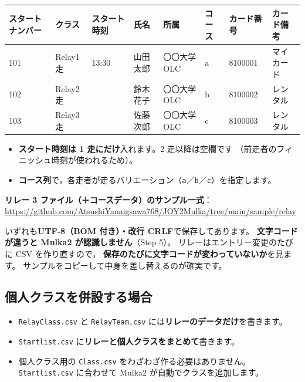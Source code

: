 \begin{center}
\small
\begin{tabular}{@{}llllllll@{}}
\toprule
スタートナンバー & クラス & スタート時刻 & 氏名 & 所属 & コース & カード番号 & カード備考 \\
\midrule
101 & Relay1走 & 13:30 & 山田 太郎 & 〇〇大学OLC & a & 8100001 & マイカード \\
102 & Relay2走 & & 鈴木 花子 & 〇〇大学OLC & b & 8100002 & レンタル \\
103 & Relay3走 & & 佐藤 次郎 & 〇〇大学OLC & c & 8100003 & レンタル \\
\bottomrule
\end{tabular}
\end{center}

\begin{itemize}
\item \textbf{スタート時刻は 1 走にだけ}入れます。2 走以降は空欄です
      （前走者のフィニッシュ時刻が使われるため）。
\item \textbf{コース列}で，各走者が走るバリエーション（\texttt{a}／\texttt{b}／\texttt{c}）を指定します。
\end{itemize}

\textbf{リレー 3 ファイル（＋コースデータ）のサンプル一式}：\\
\url{https://github.com/AtsushiYanaigsawa768/JOY2Mulka/tree/main/sample/relay}

いずれも\textbf{UTF-8（BOM 付き）・改行 CRLF}で保存してあります。
\textbf{文字コードが違うと Mulka2 が認識しません}（Step 5）。
リレーはエントリー変更のたびに CSV を作り直すので，
\textbf{保存のたびに文字コードが変わっていないか}を見ます。
サンプルをコピーして中身を差し替えるのが確実です。

\subsection*{個人クラスを併設する場合}

\begin{itemize}
\item \texttt{RelayClass.csv} と \texttt{RelayTeam.csv} には\textbf{リレーのデータだけ}を書きます。
\item \texttt{Startlist.csv} に\textbf{リレーと個人クラスをまとめて}書きます。
\item 個人クラス用の \texttt{Class.csv} をわざわざ作る必要はありません。
      \texttt{Startlist.csv} に合わせて Mulka2 が自動でクラスを追加します。
\end{itemize}

